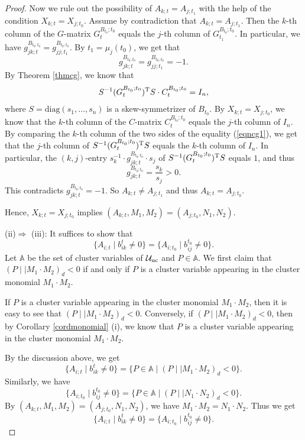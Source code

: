 \documentclass{amsart}
\theoremstyle{definition}
\theoremstyle{remark}
\numberwithin{equation}{section}
\begin{document}
\begin{proof}
Now we rule out the possibility of $A_{k;t}=A_{j;t_1}$ with the help of the condition  $X_{k;t}=X_{j;t_0}$.  Assume by contradiction that $A_{k;t}=A_{j;t_1}$. Then the $k$-th column of the $G$-matrix $G_t^{B_{t_0};t_0}$ equals the $j$-th column of $G_{t_1}^{B_{t_0};t_0}$. In particular, we have $g_{jk;t}^{B_{t_0;t_0}}=g_{jj;t_1}^{B_{t_0;t_0}}$. By $t_1=\mu_j(t_0)$, we get that
$$g_{jk;t}^{B_{t_0;t_0}}=g_{jj;t_1}^{B_{t_0;t_0}}=-1.$$
By Theorem \ref{thmcg}, we know that
 \begin{eqnarray}\label{eqncg1}
 S^{-1}(G_t^{B_{t_0};t_0})^{\rm T}S\cdot C_t^{B_{t_0};t_0}=I_n,
 \end{eqnarray}
 where  $S=\mathrm{diag}(s_1,\dots,s_n)$ is a skew-symmetrizer of $B_{t_0}$. By $X_{k;t}=X_{j;t_0}$, we know that the $k$-th column of the $C$-matrix $C_t^{B_{t_0};t_0}$ equals the $j$-th column of $I_n$. By comparing the $k$-th column of the two sides of the equality (\ref{eqncg1}), we get that the $j$-th column of $ S^{-1}(G_t^{B_{t_0};t_0})^{\rm T}S$ equals the $k$-th column of $I_n$. In particular, the $(k,j)$-entry $s_k^{-1}\cdot g_{jk;t}^{B_{t_0;t_0}}\cdot s_j$ of $S^{-1}(G_t^{B_{t_0};t_0})^{\rm T}S$ equals $1$, and thus $$g_{jk;t}^{B_{t_0;t_0}}=\frac{s_k}{s_j}>0.$$
This contradicts $g_{jk;t}^{B_{t_0;t_0}}=-1$.  So $A_{k;t}\neq A_{j;t_1}$ and thus $A_{k;t}=A_{j;t_0}$.

Hence, $X_{k;t}=X_{j;t_0}$ implies $(A_{k;t}, M_1, M_2)=(A_{j;t_0}, N_1, N_2)$.




 (ii)$\Longrightarrow$ (iii): It suffices to show that $$\{A_{i;t}\mid b_{ik}^t\neq 0\}=\{A_{i;t_0}\mid b_{ij}^{t_0}\neq 0\}.$$
 Let $\mathbb A$ be the set of cluster variables of $\mathcal U_{\rm uc}$ and $P\in \mathbb A$. We first claim that $(P\mid\mid  M_1\cdot M_2)_d<0$ if and only if $P$ is a cluster variable appearing in the cluster monomial $M_1\cdot M_2$.

 If $P$ is a cluster variable appearing in the cluster monomial $M_1\cdot M_2$, then it is easy to see that  $(P\mid\mid  M_1\cdot M_2)_d<0$. Conversely, if $(P\mid\mid  M_1\cdot M_2)_d<0$, then by Corollary \ref{cordmonomial} (i), we know that $P$ is a cluster variable appearing in the cluster monomial $M_1\cdot M_2$.


 By the discussion above, we get
 $$\{A_{i;t}\mid b_{ik}^t\neq 0\}=\{P\in \mathbb A\mid (P\mid\mid  M_1\cdot M_2)_d<0\}.$$
Similarly, we have  $$\{A_{i;t_0}\mid b_{ij}^{t_0}\neq 0\}=\{P\in \mathbb A\mid (P\mid\mid  N_1\cdot N_2)_d<0\}.$$
By $(A_{k;t}, M_1, M_2)=(A_{j;t_0}, N_1, N_2)$, we have $M_1\cdot M_2=N_1\cdot N_2$. Thus we get $$\{A_{i;t}\mid b_{ik}^t\neq 0\}=\{A_{i;t_0}\mid b_{ij}^{t_0}\neq 0\}.$$



\end{proof}
\end{document}

